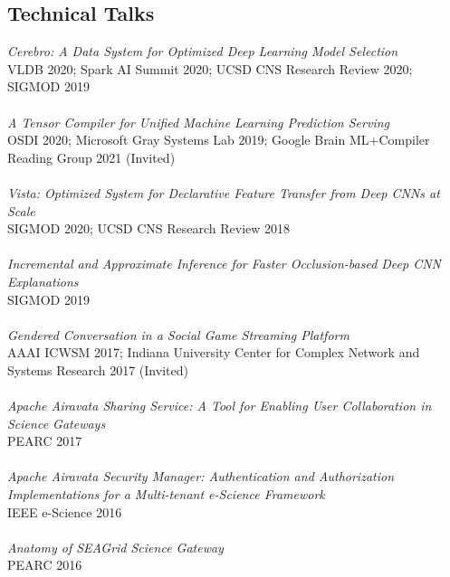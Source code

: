 \documentclass[margin]{res}
\begin{document}
\begin{resume}
\section{Technical Talks}
\textit{Cerebro: A Data System for Optimized Deep Learning Model Selection}\\ VLDB 2020; Spark AI Summit 2020; UCSD CNS Research Review 2020; SIGMOD 2019\\\\
\textit{A Tensor Compiler for Unified Machine Learning Prediction Serving}\\ OSDI 2020; Microsoft Gray Systems Lab 2019; Google Brain ML+Compiler Reading Group 2021 (Invited)\\\\
\textit{Vista: Optimized System for Declarative Feature Transfer from Deep CNNs at Scale}\\ SIGMOD 2020; UCSD CNS Research Review 2018\\\\
\textit{Incremental and Approximate Inference for Faster Occlusion-based Deep CNN Explanations}\\ SIGMOD 2019\\\\
\textit{Gendered Conversation in a Social Game Streaming Platform}\\ AAAI ICWSM 2017; Indiana University Center for Complex Network and Systems Research 2017 (Invited) \\\\
\textit{Apache Airavata Sharing Service: A Tool for Enabling User Collaboration in Science Gateways}\\ PEARC 2017 \\\\
\textit{Apache Airavata Security Manager: Authentication and Authorization Implementations for a Multi-tenant e-Science Framework}\\ IEEE e-Science 2016 \\\\
\textit{Anatomy of SEAGrid Science Gateway}\\ PEARC 2016 \\


\end{resume}
\end{document}
